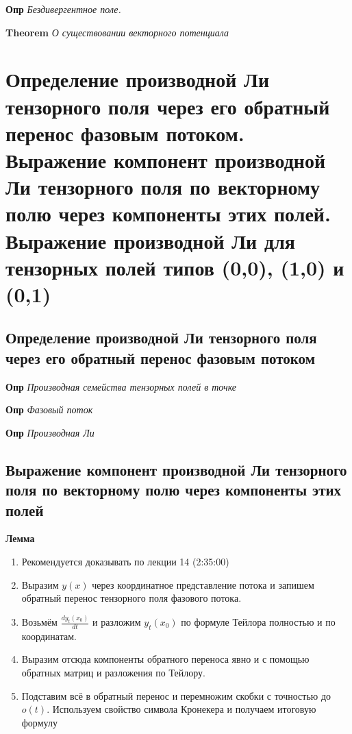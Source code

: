 \documentclass[a4paper, 14pt]{article}
\begin{document}
    \textbf{Опр} \textit{Бездивергентное поле.}
    
    \textbf{Theorem} \textit{О существовании векторного потенциала}
    
    \section{Определение производной Ли тензорного поля через его обратный перенос фазовым потоком.
    Выражение компонент производной Ли тензорного поля по векторному полю через компоненты этих полей.
    Выражение производной Ли для тензорных полей типов (0,0), (1,0) и (0,1)}
    
    \subsection{Определение производной Ли тензорного поля через его обратный перенос фазовым потоком}
    
    \textbf{Опр} \textit{Производная семейства тензорных полей в точке}
    
    \textbf{Опр} \textit{Фазовый поток}
    
    \textbf{Опр} \textit{Производная Ли}
    
    \subsection{Выражение компонент производной Ли тензорного поля по векторному полю через компоненты этих полей}
    
    \textbf{Лемма}
    
    \begin{enumerate}
        \item Рекомендуется доказывать по лекции 14 (2:35:00)
        \item Выразим $y(x)$ через координатное представление потока и запишем обратный перенос тензорного поля
        фазового потока.
        \item Возьмём $\frac{d y_t (x_0)}{dt}$ и разложим $y_t (x_0)$ по формуле Тейлора полностью и по координатам.
        \item Выразим отсюда компоненты обратного переноса явно и с помощью обратных матриц и разложения по Тейлору.
        \item Подставим всё в обратный перенос и перемножим скобки с точностью до $o(t)$.
        Используем свойство символа Кронекера и получаем итоговую формулу
    \end{enumerate}
    
\end{document}
